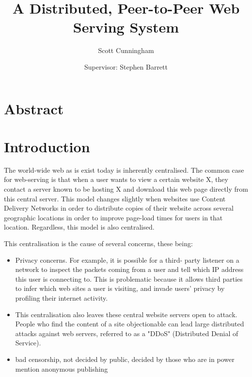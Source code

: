 \documentclass{article}
\title{A Distributed, Peer-to-Peer Web Serving System}
\begin{document}
\author{Scott Cunningham}
\date{Supervisor: Stephen Barrett}

\maketitle{}


\newpage{}

\tableofcontents{}

\newpage{}

\section*{Abstract}

\newpage{}
\section{Introduction}
%

The world-wide web as is exist today is inherently centralised. The common case for web-serving is
that when a user wants to view a certain website X, they contact a server known to be hosting X and
download this web page directly from this central server. This model changes slightly when websites
use Content Delivery Networks in order to distribute copies of their website across several
geographic locations in order to improve page-load times for users in that location. Regardless,
this model is also centralised.

This centralisation is the cause of several concerns, these being:
\begin{itemize}
    \item{Privacy concerns. For example, it is possible for a third-
          party listener on a network to inspect the packets coming from a user and tell which IP address
          this user is connecting to. This is problematic because it allows third parties to infer which web
          sites a user is visiting, and invade users' privacy by profiling their internet activity.}
    \item{This centralisation also leaves these central website servers open to attack. People who find the
content of a site objectionable can lead large distributed attacks against web servers, referred
to as a "DDoS" (Distributed Denial of Service).}
    \item{bad censorship, not decided by public, decided by those who are in power}
mention anonymous publishing

\end{itemize}
\end{document}
